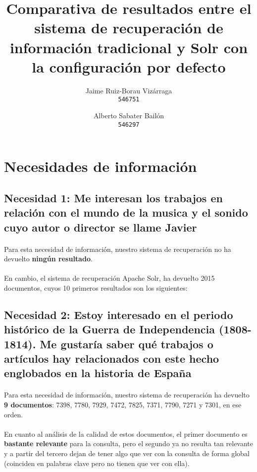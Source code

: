 \documentclass[a4paper]{article}
\begin{document}
\title{Comparativa de resultados entre el sistema de recuperación de información tradicional y Solr con la configuración por defecto}
\author{
	Jaime Ruiz-Borau Vizárraga\\
	\texttt{546751}
	\and
	Alberto Sabater Bailón\\
	\texttt{546297}
	}
\date{}
\maketitle

\section{Necesidades de información}
\subsection{Necesidad 1: Me interesan los trabajos en relación con el mundo de la musica y el sonido cuyo autor o director se llame Javier}
\paragraph{}Para esta necesidad de información, nuestro sistema de recuperación no ha devuelto \textbf{ningún resultado}.
\paragraph{}En cambio, el sistema de recuperación Apache Solr, ha devuelto 2015 documentos, cuyos 10 primeros resultados son los siguientes: 
\subsection{Necesidad 2: Estoy interesado en el periodo histórico de la Guerra de Independencia	(1808-1814). Me gustaría saber qué trabajos o artículos hay relacionados con este hecho englobados en la historia de España}
\paragraph{}Para esta necesidad de información, nuestro sistema de recuperación ha devuelto \textbf{9 documentos}: 7398, 7780, 7929, 7472, 7825, 7371, 7790, 7271 y 7301, en ese orden.
\paragraph{}En cuanto al análisis de la calidad de estos documentos, el primer documento es \textbf{bastante relevante} para la consulta, pero el segundo ya no resulta tan relevante y a partir del tercero dejan de tener algo que ver con la consulta de forma global (coinciden en palabras clave pero no tienen que ver con ella).
\end{document}
